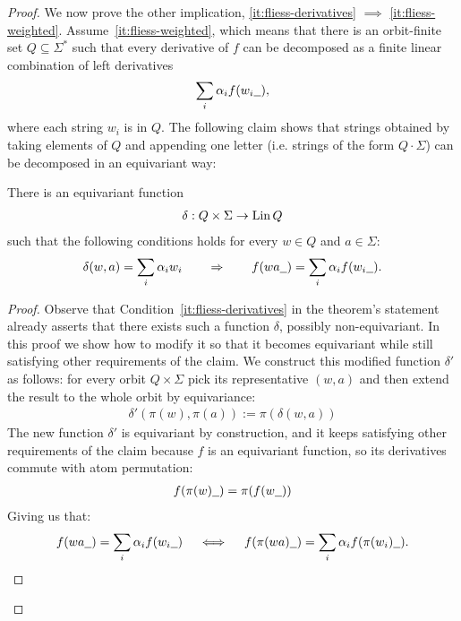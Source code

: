 \begin{proof}
    We now prove the other implication, \ref{it:fliess-derivatives} $\implies$ \ref{it:fliess-weighted}. Assume~\ref{it:fliess-weighted}, which means that   there is an orbit-finite set $Q \subseteq \Sigma^*$ such that every derivative of $f$ can be decomposed as a finite linear combination of left derivatives
    \begin{align*}
            \sum_i \alpha_i f(w_i\underline{\hspace{2mm}}),
    \end{align*}
    where each string $w_i$ is in $Q$. The following claim shows that strings obtained by taking elements of $Q$ and appending one letter
    (i.e. strings of the form $Q \cdot \Sigma$) can be decomposed in an equivariant way:
    \begin{claim}
            There is an equivariant function 
        \begin{align*}
       \delta :  Q \times \Sigma \to \operatorname{Lin} Q
        \end{align*}
        such that the following conditions holds for every $w \in Q$ and $a \in \Sigma$:
        \begin{align*}
        \delta(w,a) = 
        \sum_i \alpha_i w_i 
        \qquad \Rightarrow \qquad 
        f(wa\underline{\hspace{2mm}}) = \sum_i \alpha_i f(w_i\underline{\hspace{2mm}}).
        \end{align*}
    \end{claim}
    \begin{proof}
        Observe that Condition~\ref{it:fliess-derivatives} in the theorem's statement already asserts that there exists such a function $\delta$,
        possibly non-equivariant. In this proof we show how to modify it so that it becomes equivariant
        while still satisfying other requirements of the claim. We construct this modified function $\delta'$ as follows:
        for every orbit $Q \times \Sigma$ pick its representative $(w, a)$ and then extend the result to the whole orbit by equivariance:
        \begin{align*}
        \delta'(\pi(w), \pi(a)) := \pi(\delta(w, a))
        \end{align*}
        The new function $\delta'$ is equivariant by construction, and it keeps satisfying other requirements of the claim because
        $f$ is an equivariant function, so its derivatives commute with atom permutation:
        \begin{align*}
        f(\pi(w)\underline{\hspace{2mm}})= \pi(f(w\underline{\hspace{2mm}}))
        \end{align*}
        Giving us that:
        \begin{align*}
                    f(wa\underline{\hspace{2mm}}) = \sum_i \alpha_i f(w_i\underline{\hspace{2mm}})
                    \quad \iff \quad 
                            f(\pi(wa)\underline{\hspace{2mm}}) = \sum_i \alpha_i f(\pi(w_i)\underline{\hspace{2mm}}).
        \end{align*}
    \end{proof}        


\end{proof}
